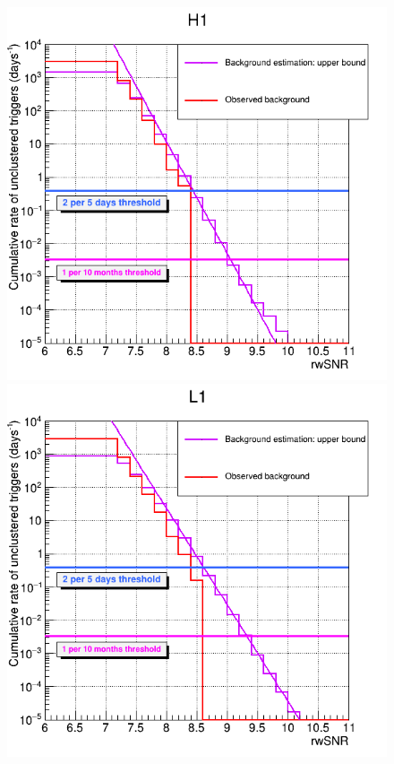 \begin{figure}
  \centering
  \begin{minipage}{0.45\linewidth}
    \centering
    \includegraphics[width=\linewidth]{sectionFAR/O4/cRateCumulH1.png}
  \end{minipage}
  \hfill
  \begin{minipage}{0.45\linewidth}
    \centering
    \includegraphics[width=\linewidth]{sectionFAR/O4/cRateCumulL1.png}

\end{minipage}
\end{figure}
